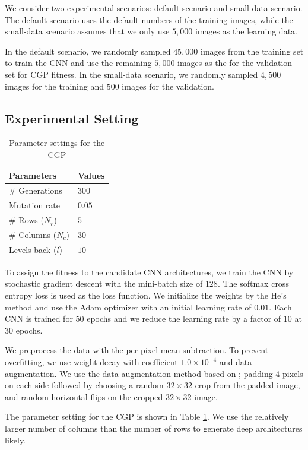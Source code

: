 We consider two experimental scenarios: default scenario and small-data scenario.
The default scenario uses the default numbers of the training images, while the small-data scenario assumes that we only use $5,000$ images as the learning data. 

In the default scenario, we randomly sampled $45,000$ images from the training set to train the CNN and use the remaining $5,000$ images as the for the validation set for CGP fitness.
In the small-data scenario, we randomly sampled $4,500$ images for the training and $500$ images for the validation.

\subsection{Experimental Setting}

\begin{table}[t]
  \caption{Parameter settings for the CGP}
  \label{cgp_param}
  \begin{tabular}{l|l} \hline
    Parameters & Values \\ \hline
   \# Generations & $300$ \\ 
   Mutation rate & $0.05$ \\
   \#  Rows ($N_r$) & $5$ \\
   \#  Columns ($N_c$) & $30$ \\
   Levels-back ($l$) & $10$ \\ \hline
  \end{tabular}
\end{table}


To assign the fitness to the candidate CNN architectures, we train the CNN by stochastic gradient descent with the mini-batch size of $128$. The softmax cross entropy loss is used as the loss function.
We initialize the weights by the He's method \cite{he_delving_2015} and use the Adam optimizer \cite{kingma_adam:_2015} with an initial learning rate of $0.01$. 
Each CNN is trained for $50$ epochs and we reduce the learning rate by a factor of $10$ at $30$ epochs.

We preprocess the data with the per-pixel mean subtraction.
To prevent overfitting, we use weight decay with coefficient $1.0\times 10^{-4}$ and data augmentation.
We use the data augmentation method based on \todo{\cite{}}; padding $4$ pixels on each side followed by choosing a random $32\times 32$ crop from the padded image, and random horizontal flips on the cropped $32 \times 32$ image.

The parameter setting for the CGP is shown in Table \ref{cgp_param}. We use the relatively larger number of columns than the number of rows to generate deep architectures likely.

